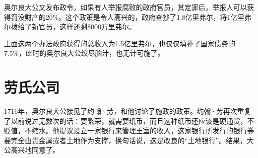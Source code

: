 \documentclass[12pt,oneside]{book}
\begin{document}
奥尔良大公又发布政令，如果有人举报腐败的政府官员，其定罪后，举报人可以获得罚没财产的20\%。这个政策是令人高兴的，政府查抄了1.8亿里弗尔，将1亿里弗尔拨给了新官员，这样还剩8000万里弗尔。

上面这两个办法政府获得的总收入为1.5亿里弗尔，也仅仅填补了国家债务的7.5\%，此时的奥尔良大公绞尽脑汁，也无计可施了。

\section{劳氏公司}
1716年，奥尔良大公接见了约翰·劳，和他讨论了施政的政策。约翰·劳再次重复了以前说过无数次的话：要繁荣，就需要纸币，而且这种纸币还应该是硬通货，不贬值，不缩水。他提议设立一家银行来管理王室的收入，这家银行所发行的银行券要完全由贵金属或者土地作为支撑，换句话说，这是改良的“土地银行”。结果，大公高兴地同意了。
\end{document}
